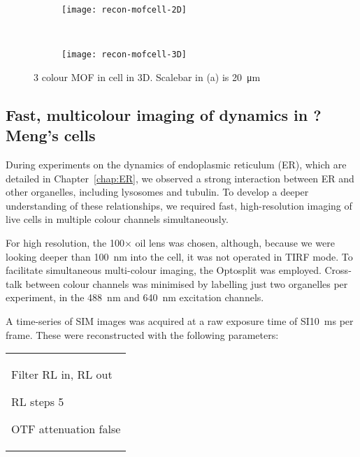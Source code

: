 \begin{figure}[tbp!]
\centering
\begin{subfigure}[b]{0.7\textwidth}
	\texttt{[image: recon-mofcell-2D]}
	\caption{}\label{fig:recon-mofcell-2D}
\end{subfigure}

~\newline
\begin{subfigure}[b]{0.7\textwidth}
	\texttt{[image: recon-mofcell-3D]}
	\caption{}\label{fig:recon-mofcell-3D}
\end{subfigure}
\caption[LAG SIM: 3D reconstruction of ?? cell]{3 colour MOF in cell in 3D. Scalebar in (a) is \SI{20}{\micro\metre}}
\label{fig:recon-mofcell}
\end{figure}

\subsection{Fast, multicolour imaging of dynamics in ?Meng's cells}
During experiments on the dynamics of endoplasmic reticulum (ER), which are detailed in Chapter~\ref{chap:ER}, we observed a strong interaction between ER and other organelles, including lysosomes and tubulin. 
To develop a deeper understanding of these relationships, we required fast, high-resolution imaging of live cells in multiple colour channels simultaneously. 

For high resolution, the 100$\times$ oil lens was chosen, although, because we were looking deeper than \SI{100}{\nano\metre} into the cell, it was not operated in TIRF mode. 
To facilitate simultaneous multi-colour imaging, the Optosplit was employed. 
Cross-talk between colour channels was minimised by labelling just two organelles per experiment, in the \SI{488}{\nano\metre} and \SI{640}{\nano\metre} excitation channels. 

A time-series of SIM images was acquired at a raw exposure time of SI\SI{10}{\milli\second} per frame. 
These were reconstructed with the following parameters: \newline
\begin{tabular}{p{}}
\begin{labelling}[margin=OTF attenuation]
	\item[Filter] RL in, RL out
	\item[RL steps] 5
	\item[OTF attenuation] false
\end{labelling}
\end{tabular}

